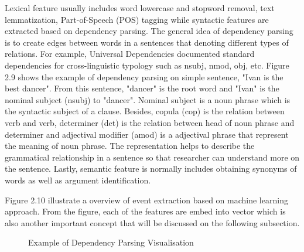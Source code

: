 \documentclass[twoside]{utmthesis}
\begin{document}
Lexical feature usually includes word lowercase and stopword removal, text lemmatization, Part-of-Speech (POS) tagging while syntactic features are extracted based on dependency parsing. The general idea of dependency parsing is to create edges between words in a sentences that denoting different types of relations. For example, Universal Dependencies \citep{deuniversal} documented standard dependencies for cross-linguistic typology such as nsubj, nmod, obj, etc. Figure 2.9 shows the example of dependency parsing on simple sentence, "Ivan is the best dancer". From this sentence, "dancer" is the root word and "Ivan" is the nominal subject (nsubj) to "dancer". Nominal subject is a noun phrase which is the syntactic subject of a clause. Besides, copula (cop) is the relation between verb and verb, determiner (det) is the relation between head of noun phrase and determiner and adjectival modifier (amod) is a adjectival phrase that represent the meaning of noun phrase. The representation helps to describe the grammatical relationship in a sentence so that researcher can understand more on the sentence. Lastly, semantic feature is normally includes obtaining synonyms of words as well as argument identification.

Figure 2.10 illustrate a overview of event extraction based on machine learning approach. From the figure, each of the features are embed into vector which is also another important concept that will be discussed on the following subsection. 

\begin{figure}[H]
	\centering
	\caption{Example of Dependency Parsing Visualisation}
	\label{fig:dependencyparsing}
\end{figure}
\vspace{-1.5cm}
\end{document}
